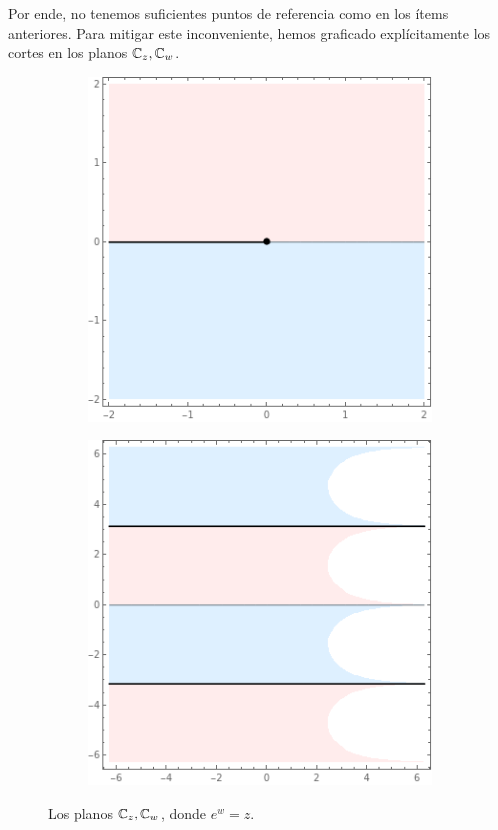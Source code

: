\begin{solution}
\begin{itemize}
\begin{enumerate}[label=\alph*)]
        Por ende, no tenemos suficientes puntos de referencia como en los ítems anteriores. Para mitigar este inconveniente, hemos graficado explícitamente los cortes en los planos $\mathbb C_z, \mathbb C_w$.
        \begin{figure}[h]
            \centering
            \begin{subfigure}{.4\textwidth}
                \centering
                \includegraphics[scale=0.4]{ramification/5-z.png}
            \end{subfigure}
            \begin{subfigure}{.4\textwidth}
                \centering
                \includegraphics[scale=0.4]{ramification/5-w.png}
            \end{subfigure}
            \caption{Los planos $\mathbb C_z, \mathbb C_w$, donde $e^w = z$.}
        \end{figure}
        

\end{enumerate}
\end{itemize}
\end{solution}
